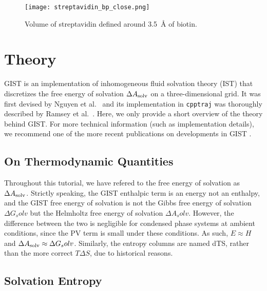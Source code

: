 \documentclass[9pt,tutorial]{livecoms}
\newcommand{\dasolv}{\Delta A_\textup{solv}}
\newcommand{\software}{\texttt}
\begin{document}
\begin{figure}
	\centering
	\texttt{[image: streptavidin\_bp\_close.png]}
	\caption{Volume of streptavidin defined around \qty{3.5}{\angstrom} of biotin. }\label{streptavidin_volume}
\end{figure}

\pagebreak %
\section{Theory}
\label{sec:theory}
GIST is an implementation of inhomogeneous fluid solvation theory (IST) \cite{Lazaridis1998} that discretizes the free energy of solvation $\dasolv$ on a three-dimensional grid. 
It was first devised by Nguyen et al.\ \cite{Nguyen2012} and its implementation in \software{cpptraj} was thoroughly described by Ramsey et al.\ \cite{Ramsey2016}.
Here, we only provide a short overview of the theory behind GIST.
For more technical information (such as implementation details), we recommend one of the more recent publications on developments in GIST \cite{Kraml2020,Chen2021,Roe2023-mpi-gist}.
\subsection{On Thermodynamic Quantities}
Throughout this tutorial, we have refered to the free energy of solvation as $\dasolv$.
Strictly speaking, the GIST enthalpic term is an energy not an enthalpy, and the GIST free energy of solvation is not the Gibbs free energy of solvation $\Delta G_solv$ but the Helmholtz free energy of solvation $\Delta A_solv$.
However, the difference between the two is negligible for condensed phase systems at ambient conditions, since the PV term is small under these conditions.
As such, $E \approx H$ and $\dasolv \approx \Delta G_solv$.
Similarly, the entropy columns are named dTS, rather than the more correct $T\Delta S$, due to historical reasons.
\subsection{Solvation Entropy}
\end{document}
